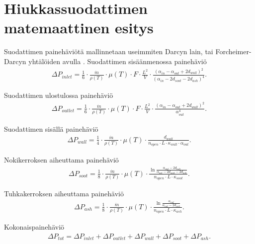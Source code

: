 \section{Hiukkassuodattimen matemaattinen esitys}

%     
Suodattimen painehäviötä mallinnetaan useimmiten Darcyn lain, tai Forcheimer-Darcyn yhtälöiden avulla \cite{dieselnet_wall_flow_monolith}.
Suodattimen sisäänmenossa painehäviö
\begin{align}
    \Delta P_{inlet} = \frac{1}{6} \cdot
    \frac{\dot{m}}{\rho(T)} \cdot \mu(T) 
    \cdot F \cdot \frac{L^2}{V} \cdot \frac{(\alpha_{in}-\alpha_{out}+2 d_{wall})^2}{(\alpha_{in}-2d_{soot}-2d_{ash})^4}.
    \label{eq:PDinletchannel}
\end{align}

Suodattimen ulostulossa painehäviö
\begin{align}
    \Delta P_{outlet} = \frac{1}{6} \cdot
    \frac{\dot{m}}{\rho(T)} \cdot \mu(T) 
    \cdot F \cdot \frac{L^2}{V} \cdot \frac{(\alpha_{in}-\alpha_{out}+2 d_{wall})^2}{\alpha_{out}^4}.
    \label{eq:PDoutletopen}
\end{align}

Suodattimen sisällä painehäviö 
\begin{align}
    \Delta P_{wall} = \frac{1}{4} \cdot
    \frac{\dot{m}}{\rho(T)} \cdot \mu(T) 
    \cdot \frac{d_{wall}}
    {n_{open}\cdot L \cdot \kappa_{wall} \cdot \alpha_{out}}.
    \label{eq:PDfilterwall}
\end{align}

Nokikerroksen aiheuttama painehäviö
\begin{align}
    \Delta P_{soot} =  \frac{1}{8} \cdot
    \frac{\dot{m}}{\rho(T)} \cdot \mu(T) \cdot 
    \frac{\ln{\frac{\alpha_{out}-2d_{ash}}{\alpha_{out}-2d_{soot}-2d_{ash}}}}
    {n_{open}\cdot L \cdot \kappa_{soot}}.
    \label{eq:PDsootlayer}
\end{align}

Tuhkakerroksen aiheuttama painehäviö
\begin{align}
    \Delta P_{ash} = \frac{1}{8} \cdot
    \frac{\dot{m}}{\rho(T)} \cdot \mu(T) \cdot 
    \frac{\ln{\frac{\alpha_{out}}{\alpha_{out}-2d_{ash}}}}
    {n_{open}\cdot L \cdot \kappa_{ash}}.
    \label{eq:PDashlayer}
\end{align}

Kokonaispainehäviö
\begin{align}
    \Delta P_{tot}  = \Delta P_{inlet} +  \Delta P_{outlet} + \Delta P_{wall} + \Delta P_{soot} +  \Delta P_{ash}.
\end{align}